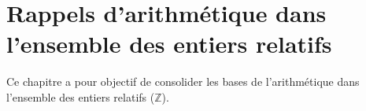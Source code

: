
\chapter{Rappels d'arithmétique dans l’ensemble des entiers relatifs}

Ce chapitre a pour objectif de consolider les bases de l'arithmétique dans l'ensemble des entiers relatifs ($\mathbb{Z}$).








